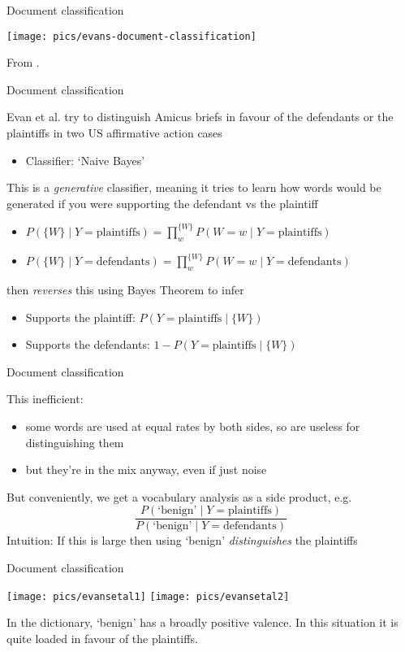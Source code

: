 \documentclass{hertieteaching}
\begin{document}
\begin{frame}{Document classification}

\bigskip
\centerline{\texttt{[image: pics/evans-document-classification]} } 

From \cite{Evans.etal2007}.
\end{frame}
\begin{frame}{Document classification}

Evan et al. try to distinguish Amicus briefs in favour of the defendants or the plaintiffs in two US affirmative action cases
\begin{itemize}
  \item Classifier: `Naive Bayes'
\end{itemize}

This is a \textit{generative} classifier, meaning it tries to learn how words would be generated if you were supporting the defendant vs the plaintiff
\begin{itemize}
  \item $P(\{W\} \mid Y =\text{plaintiffs}) = \prod_w^{\{W\}} P(W=w \mid Y =\text{plaintiffs})$
  \item $P(\{W\} \mid Y =\text{defendants}) = \prod_w^{\{W\}} P(W=w \mid Y =\text{defendants})$
\end{itemize}
then \textit{reverses} this using Bayes Theorem to infer
\begin{itemize}
  \item Supports the plaintiff: $P(Y =\text{plaintiffs} \mid \{W\})$ 
  \item Supports the defendants: $1-P(Y =\text{plaintiffs} \mid \{W\})$
\end{itemize}

\end{frame}
\begin{frame}{Document classification}

This inefficient: 
\begin{itemize}
  \item some words are used at equal rates by both sides, so are useless for distinguishing them
  \item but they're in the mix anyway, even if just noise
\end{itemize}
But conveniently, we get a vocabulary analysis as a side product, e.g.
$$
\frac{P(\text{`benign'} \mid Y =\text{plaintiffs})}{P(\text{`benign'} \mid Y =\text{defendants})}
$$
Intuition: If this is large then using `benign' \textit{distinguishes} the plaintiffs
  
\end{frame}
\begin{frame}{Document classification}

\bigskip
\centerline{\texttt{[image: pics/evansetal1]} \texttt{[image: pics/evansetal2]} }  

\bigskip
In the dictionary, `benign' has a broadly positive valence. In this situation it is quite loaded in favour of the plaintiffs.
\end{frame}
\end{document}
